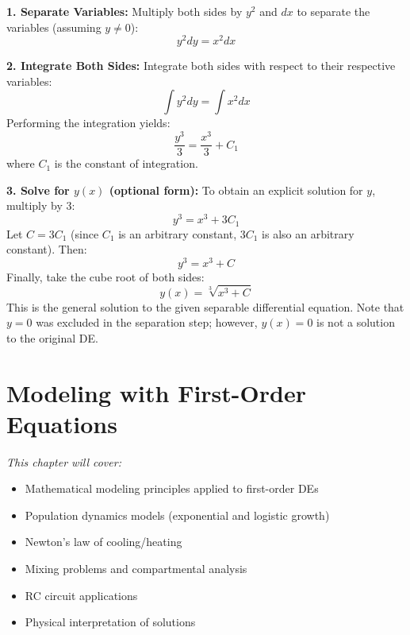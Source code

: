 \documentclass[12pt, letterpaper]{book}
\begin{document}
\textbf{1. Separate Variables:}
Multiply both sides by $y^2$ and $dx$ to separate the variables (assuming $y \neq 0$):
\begin{equation}
    y^2 dy = x^2 dx
\end{equation}

\textbf{2. Integrate Both Sides:}
Integrate both sides with respect to their respective variables:
\begin{equation}
    \int y^2 dy = \int x^2 dx
\end{equation}
Performing the integration yields:
\begin{equation}
    \frac{y^3}{3} = \frac{x^3}{3} + C_1
\end{equation}
where $C_1$ is the constant of integration.

\textbf{3. Solve for $y(x)$ (optional form):}
To obtain an explicit solution for $y$, multiply by 3:
\begin{equation}
    y^3 = x^3 + 3C_1
\end{equation}
Let $C = 3C_1$ (since $C_1$ is an arbitrary constant, $3C_1$ is also an arbitrary constant). Then:
\begin{equation}
    y^3 = x^3 + C
\end{equation}
Finally, take the cube root of both sides:
\begin{equation}
    y(x) = \sqrt[3]{x^3 + C}
    \label{eq:book_ex_separable_solution}
\end{equation}
This is the general solution to the given separable differential equation. Note that $y=0$ was excluded in the separation step; however, $y(x)=0$ is not a solution to the original DE.

\chapter{Modeling with First-Order Equations}
\label{chap:session_3}

\textit{This chapter will cover:}
\begin{itemize}
    \item Mathematical modeling principles applied to first-order DEs
    \item Population dynamics models (exponential and logistic growth)
    \item Newton's law of cooling/heating
    \item Mixing problems and compartmental analysis
    \item RC circuit applications
    \item Physical interpretation of solutions
\end{itemize}
\end{document}
